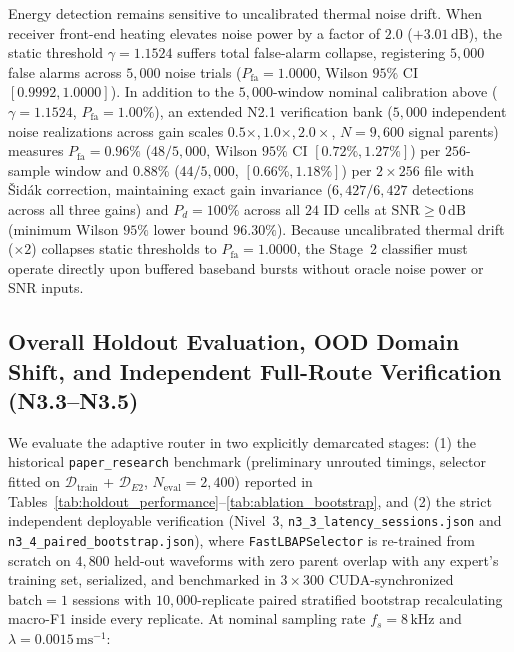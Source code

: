 Energy detection remains sensitive to uncalibrated thermal noise drift. When receiver front-end heating elevates noise power by a factor of $2.0$ ($+3.01\,\mathrm{dB}$), the static threshold $\gamma = 1.1524$ suffers total false-alarm collapse, registering $5{,}000$ false alarms across $5{,}000$ noise trials ($P_{\mathrm{fa}} = 1.0000$, Wilson $95\%$ CI $[0.9992, 1.0000]$). In addition to the $5{,}000$-window nominal calibration above ($\gamma = 1.1524$, $P_{\mathrm{fa}} = 1.00\%$), an extended N2.1 verification bank ($5{,}000$ independent noise realizations across gain scales $0.5\times, 1.0\times, 2.0\times$, $N = 9{,}600$ signal parents) measures $P_{\mathrm{fa}} = 0.96\%$ ($48/5{,}000$, Wilson $95\%$ CI $[0.72\%, 1.27\%]$) per $256$-sample window and $0.88\%$ ($44/5{,}000$, $[0.66\%, 1.18\%]$) per $2\times 256$ file with \v{S}id\'ak correction, maintaining exact gain invariance ($6{,}427/6{,}427$ detections across all three gains) and $P_d = 100\%$ across all $24$ ID cells at $\mathrm{SNR} \ge 0\,\mathrm{dB}$ (minimum Wilson $95\%$ lower bound $96.30\%$). Because uncalibrated thermal drift ($\times 2$) collapses static thresholds to $P_{\mathrm{fa}} = 1.0000$, the Stage~2 classifier must operate directly upon buffered baseband bursts without oracle noise power or SNR inputs.

\subsection{Overall Holdout Evaluation, OOD Domain Shift, and Independent Full-Route Verification (N3.3--N3.5)}
\label{subsec:holdout_performance}

We evaluate the adaptive router in two explicitly demarcated stages: (1) the historical \texttt{paper\_research} benchmark (preliminary unrouted timings, selector fitted on $\mathcal{D}_{\mathrm{train}}$ + $\mathcal{D}_{E2}$, $N_{\mathrm{eval}} = 2{,}400$) reported in Tables~\ref{tab:holdout_performance}--\ref{tab:ablation_bootstrap}, and (2) the strict independent deployable verification (Nivel~3, \texttt{n3\_3\_latency\_sessions.json} and \texttt{n3\_4\_paired\_bootstrap.json}), where \texttt{FastLBAPSelector} is re-trained from scratch on $4{,}800$ held-out waveforms with zero parent overlap with any expert's training set, serialized, and benchmarked in $3\times 300$ CUDA-synchronized $\text{batch}=1$ sessions with $10{,}000$-replicate paired stratified bootstrap recalculating macro-F1 inside every replicate. At nominal sampling rate $f_s = 8\,\mathrm{kHz}$ and $\lambda = 0.0015\,\mathrm{ms}^{-1}$:

